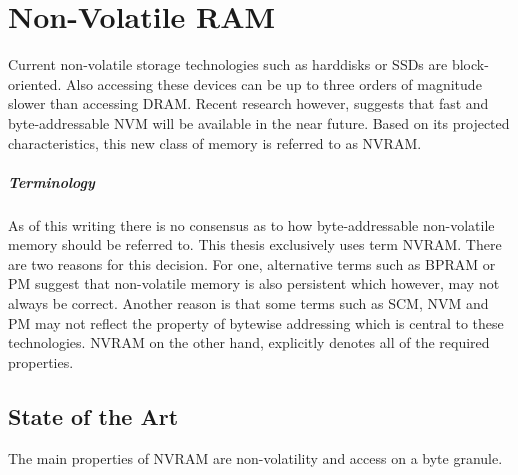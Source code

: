 \chapter{Non-Volatile RAM}
\label{ch:nvram}

Current non-volatile storage technologies such as harddisks or \acp{SSD} are
block-oriented. Also accessing these devices can be up to three orders of
magnitude slower than accessing \ac{DRAM}. Recent research however, suggests
that fast and byte-addressable \ac{NVM} will be available in the near future.
Based on its projected characteristics, this new class of memory is referred to
as \ac{NVRAM}.


\paragraph{Terminology}

As of this writing there is no consensus as to how byte-addressable non-volatile
memory should be referred to. This thesis exclusively uses term \ac{NVRAM}.
There are two reasons for this decision. For one, alternative terms such as
\ac{BPRAM} or \ac{PM} suggest that non-volatile memory is also persistent which
however, may not always be correct. Another reason is that some
terms such as \ac{SCM}, \ac{NVM} and \ac{PM} may not reflect the property of
bytewise addressing which is central to these technologies. \ac{NVRAM} on the
other hand, explicitly denotes all of the required properties.


\section{State of the Art}


The main properties of NVRAM are non-volatility and access on a byte granule.




